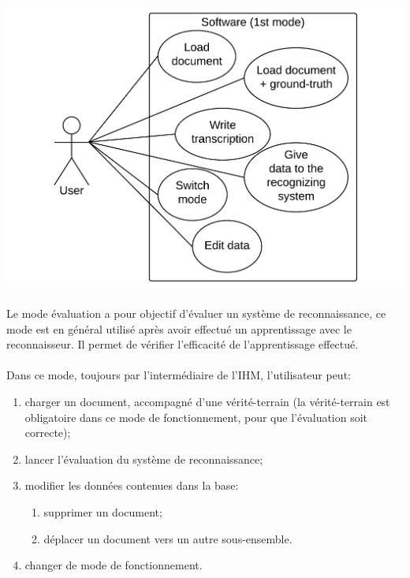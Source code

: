 \paragraph{}

\begin{mdframed}[frametitle={Figure 2 : Diagramme de cas d'utilisation (mode apprentissage)}, innerbottommargin=10]
\begin{center}
\includegraphics[width=\linewidth]{Usecase_1.pdf}
\end{center}
\end{mdframed}

\paragraph{}

Le mode évaluation a pour objectif d’évaluer un système de reconnaissance, ce mode est en général utilisé après avoir effectué un apprentissage avec le reconnaisseur. Il permet de vérifier l’efficacité de l’apprentissage effectué.

\paragraph{}

Dans ce mode, toujours par l’intermédiaire de l’IHM, l’utilisateur peut:

\begin{enumerate}
	\item charger un document, accompagné d’une vérité-terrain (la vérité-terrain est obligatoire dans ce mode de fonctionnement, pour que l’évaluation soit correcte);
	\item lancer l’évaluation du système de reconnaissance;
	\item modifier les données contenues dans la base:
		\begin{enumerate}
			\item supprimer un document;
			\item déplacer un document vers un autre sous-ensemble.
		\end{enumerate}
	\item changer de mode de fonctionnement.
\end{enumerate}


